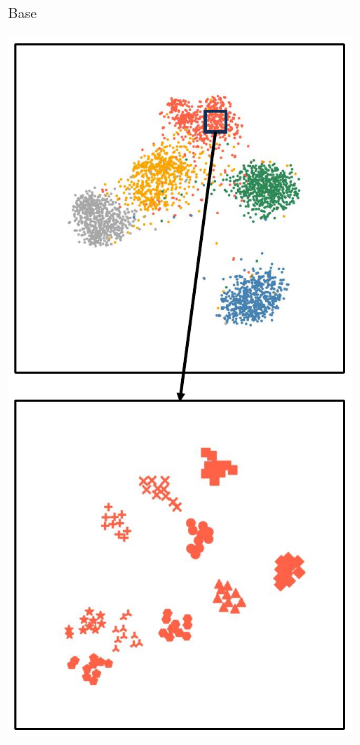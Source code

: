 \begin{figure}[h!]
\begin{subfigure}{0.24\columnwidth}
    \caption{Base}
    \label{figure3: t-SNE Base}
    \end{subfigure}
    \begin{subfigure}{0.24\columnwidth}
    \includegraphics[width=\columnwidth]{figures/MGSRCL/t-SNE/Base + TCL.pdf}

\end{subfigure}
\end{figure}
